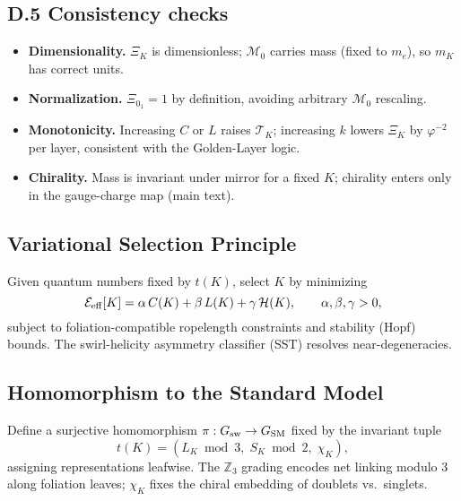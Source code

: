 \subsection*{D.5 Consistency checks}
\begin{itemize}
    \item \textbf{Dimensionality.} \(\Xi_K\) is dimensionless; \(\mathcal{M}_0\) carries mass (fixed to \(m_e\)), so \(m_K\) has correct units.
    \item \textbf{Normalization.} \(\Xi_{0_1}=1\) by definition, avoiding arbitrary \(\mathcal{M}_0\) rescaling.
    \item \textbf{Monotonicity.} Increasing \(C\) or \(L\) raises \(\mathcal{T}_K\); increasing \(k\) lowers \(\Xi_K\) by \(\varphi^{-2}\) per layer, consistent with the Golden-Layer logic.
    \item \textbf{Chirality.} Mass is invariant under mirror for a fixed \(K\); chirality enters only in the gauge-charge map (main text).
\end{itemize}

\subsection{Variational Selection Principle}
Given quantum numbers fixed by \(t(K)\), select \(K\) by minimizing
\begin{equation}
\mathcal E_{\rm eff}[K]=\alpha\,C(K)+\beta\,L(K)+\gamma\,\mathcal H(K),\qquad \alpha,\beta,\gamma>0,
\end{equation}
subject to foliation-compatible ropelength constraints and stability (Hopf) bounds. The swirl-helicity asymmetry classifier (SST) resolves near-degeneracies.


\subsection{Homomorphism to the Standard Model}
Define a surjective homomorphism \(\pi:G_{\rm sw}\to G_{\rm SM}\) fixed by the invariant tuple
\begin{equation}
t(K)=(L_K\bmod 3,\; S_K\bmod 2,\; \chi_K),
\end{equation}
assigning representations leafwise. The \(\mathbb Z_3\) grading encodes net linking modulo 3 along foliation leaves; \(\chi_K\) fixes the chiral embedding of doublets vs.\ singlets.

